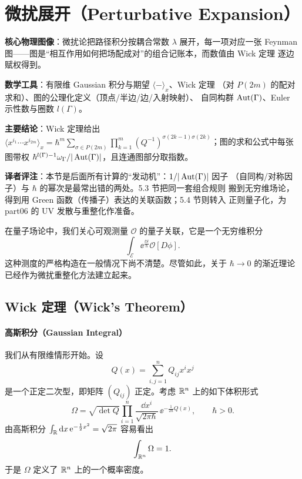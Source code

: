
\section{微扰展开（Perturbative Expansion）}

\begin{keypoints}
  \item \textbf{核心物理图像}：微扰论把路径积分按耦合常数 $\lambda$ 展开，每一项对应一张
        Feynman 图——图是“相互作用如何把场配成对”的组合记账本，而数值由 Wick 定理
        逐边赋权得到。
  \item \textbf{数学工具}：有限维 Gaussian 积分与期望 $\langle-\rangle_x$、Wick 定理
        （对 $P(2m)$ 的配对求和）、图的公理化定义（顶点/半边/边/入射映射）、
        自同构群 $\operatorname{Aut}(\Gamma)$、Euler 示性数与圈数 $l(\Gamma)$。
  \item \textbf{主要结论}：Wick 定理给出
        $\bigl\langle x^{i_1}\cdots x^{i_{2m}}\bigr\rangle_x
        =\hbar^m\sum_{\sigma\in P(2m)}\prod_{k=1}^{m}
        (Q^{-1})^{\sigma(2k-1)\sigma(2k)}$；图的求和公式中每张图带权
        $\hbar^{l(\Gamma)-1}\omega_\Gamma/|\operatorname{Aut}(\Gamma)|$，且连通图部分取指数。
  \item \textbf{译者评注}：本节是后面所有计算的“发动机”：$1/|\operatorname{Aut}(\Gamma)|$ 因子
        （自同构/对称因子）与 $\hbar$ 的幂次是最常出错的两处。5.3 节把同一套组合规则
        搬到无穷维场论，得到用 Green 函数（传播子）表达的关联函数；5.4 节则转入
        正则量子化，为 part06 的 UV 发散与重整化作准备。
\end{keypoints}

在量子场论中，我们关心可观测量 $\mathcal O$ 的量子关联，它是一个无穷维积分
\[
  \int_{\mathcal E}\ee^{\frac{\ii S}{\hbar}}\mathcal O[D\phi].
\]
这种测度的严格构造在一般情况下尚不清楚。尽管如此，关于 $\hbar\to0$ 的渐近理论
已经作为微扰重整化方法建立起来。

\subsection{Wick 定理（Wick's Theorem）}

\paragraph{高斯积分（Gaussian Integral）}
我们从有限维情形开始。设
\[
  Q(x)=\sum_{i,j=1}^{n}Q_{ij}x^{i}x^{j}
\]
是一个正定二次型，即矩阵 $(Q_{ij})$ 正定。考虑 $\mathbb{R}^n$ 上的如下体积形式
\[
  \Omega=\sqrt{\det Q}\prod_{i=1}^{n}\frac{\dd x^{i}}{\sqrt{2\pi\hbar}}\,
  \ee^{-\frac{1}{2\hbar}Q(x)},
  \qquad \hbar>0.
\]
由高斯积分 $\int_{\mathbb{R}}\mathrm{d} x\,\mathrm{e}^{-\frac{1}{2}x^{2}}=\sqrt{2\pi}$ 容易看出
\[
  \int_{\mathbb{R}^{n}}\Omega=1.
\]
于是 $\Omega$ 定义了 $\mathbb{R}^n$ 上的一个概率密度。

